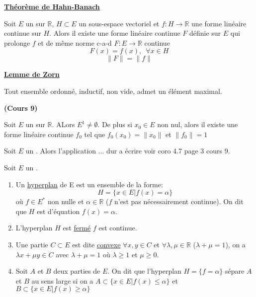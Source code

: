 \documentclass[12pt,a4paper]{article}
\begin{document}
\begin{flushleft}
\textbf{\underline{Théorème de Hahn-Banach}}
\begin{thm}
Soit $E$ un \evn sur $\mathbb{R}$, $H \subset E$ un sous-espace vectoriel et $f: H \longrightarrow \mathbb{R}$ une forme linéaire continue sur $H$. Alors il existe une forme linéaire continue $F$ définie sur $E$ qui prolonge $f$ et de même norme c-a-d $F: E \longrightarrow \mathbb{R}$ continue $$F(x) = f(x), \enspace \forall x \in H$$ $$\lVert F \rVert = \lVert f \rVert $$
\end{thm}


\textbf{\underline{Lemme de Zorn}}
\begin{lem}
Tout ensemble ordonné, inductif, non vide, admet un élément maximal.
\end{lem}

\textbf{(Cours 9)}



\begin{cor}
Soit $E$ un \evn sur $\mathbb{R}$. ALors $E^1 \neq \emptyset$. De plus si $x_0 \in E$ non nul, alors il existe une forme linéaire continue $f_0$ tel que $f_0 (x_0) = \lVert x_0 \rVert$ et $\lVert f_0 \rVert = 1$
\end{cor}

\begin{cor}
Soit $E$ un \evn . Alors l'application ... dur a écrire voir coro 4.7 page 3 cours 9.
\end{cor}

\begin{mydef}
Soit $E$ un \evn . 
\begin{enumerate}
\item Un \underline{hyperplan} de E est un ensemble de la forme: $$ H = \{ x \in E | f(x) = \alpha \}$$ où $f \in E^*$ non nulle et $\alpha \in \mathbb{R}$ ($f$ n'est pas nécessairement continue). On dit que $H$ est d'équation $f(x) = \alpha$.
\item L'hyperplan $H$ est \underline{fermé} \ssi $f$ est continue.
\item Une partie $C \subset E$ est dite \underline{convexe} \ssi $\forall x, y \in C$ et $\forall \lambda , \mu \in \mathbb{R}$ ($\lambda + \mu = 1$), on a $\lambda x + \mu y \in C$ avec $\lambda + \mu = 1$ où $\lambda \geq 1$ et $\mu \geq 0$.


\item Soit $A$ et $B$ deux parties de $E$. On dit que l'hyperplan $H = \{ f = \alpha \}$ sépare $A$ et $B$ au sens large si on a $ A  \subset \{ x \in E | f(x) \leq \alpha \}$ et $B \subset \{ x \in E | f(x) \geq \alpha \}$


\end{enumerate}
\end{mydef}
\end{flushleft}
\end{document}

